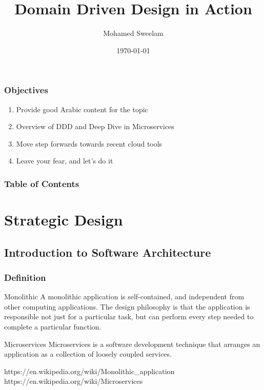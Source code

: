 \documentclass{beamer}
\title[Domain Driven Design in Action]{Domain Driven Design in Action}
\author{Mohamed Sweelam}
\institute[msweelam.carrd.co]
{
	Software Engineer \\
	\medskip
	\textit{md.sweelam@gmail.com}
}
\date{\today}
\begin{document}
	\begin{frame}
	\titlepage
\end{frame}

\begin{frame}
	\frametitle{Objectives} 
		\begin{enumerate}
			\item<1-> \large {Provide good Arabic content for the topic}
			\item<2-> \large {Overview of DDD and Deep Dive in Microservices}
			\item<3-> \large {Move step forwards towards recent cloud tools}
			\item<4-> \large {Leave your fear, and let's do it}
		\end{enumerate}
\end{frame}

\begin{frame}
\frametitle{Table of Contents} 
	\scriptsize
	\tableofcontents
\end{frame}


\section{Strategic Design}
	\subsection {Introduction to Software Architecture}
		\begin{frame}
			\frametitle{Definition}
				\begin{block}{Monolithic}
					A monolithic application is self-contained, and independent from other computing applications. The design philosophy is that the application is responsible not just for a particular task, but can perform every step needed to complete a particular function.
				\end{block}
			
			\vspace{5mm}
			\begin{block}{Microservices}
				Microservices is a software development technique that arranges an application as a collection of loosely coupled services. 
			\end{block}
			
			\vspace{10mm}
			\tiny{https://en.wikipedia.org/wiki/Monolithic\_application}\\
			\tiny{https://en.wikipedia.org/wiki/Microservices}		
		\end{frame}
		
\end{document}
